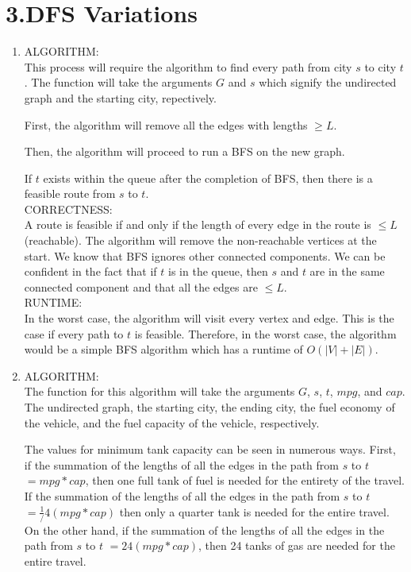 \documentclass[11pt]{article}
\newenvironment{qparts}{\begin{enumerate}[{(}a{)}]}{\end{enumerate}}
\begin{document}
\section*{3.DFS Variations}
\begin{qparts}

\item 
ALGORITHM:\\


This process will require the algorithm to find every path from city $s$ to city $t$. The function will take the arguments $G$ and $s$ which signify the undirected graph and the starting city, repectively. 

First, the algorithm will remove all the edges with lengths $\geq L$. 

Then, the algorithm will proceed to run a BFS on the new graph. 

If $t$ exists within the queue after the completion of BFS, then there is a feasible route from $s$ to $t$.
\\

CORRECTNESS:\\
A route is feasible if and only if the length of every edge in the route is $\leq L$ (reachable). The algorithm will remove the non-reachable vertices at the start. We know that BFS ignores other connected components. We can be confident in the fact that if $t$ is in the queue, then $s$ and $t$ are in the same connected component and that all the edges are $\leq L$.
\\ 

RUNTIME:\\
In the worst case, the algorithm will visit every vertex and edge. This is the case if every path to $t$ is feasible. Therefore, in the worst case, the algorithm would be a simple BFS algorithm which has a runtime of $O(|V|+|E|)$.


\item
ALGORITHM:\\
The function for this algorithm will take the arguments $G$, $s$, $t$, $mpg$, and $cap$. The undirected graph, the starting city, the ending city, the fuel economy of the vehicle, and the fuel capacity of the vehicle, respectively.    

The values for minimum tank capacity can be seen in numerous ways. First, if the summation of the lengths of all the edges in the path from $s$ to $t$ $= mpg*cap$, then one full tank of fuel is needed for the entirety of the travel. If the summation of the lengths of all the edges in the path from $s$ to $t$ $= \frac{1}/{4}(mpg*cap)$ then only a quarter tank is needed for the entire travel. On the other hand, if the summation of the lengths of all the edges in the path from $s$ to $t$ $= 24(mpg*cap)$, then 24 tanks of gas are needed for the entire travel.


\end{qparts}
\end{document}

